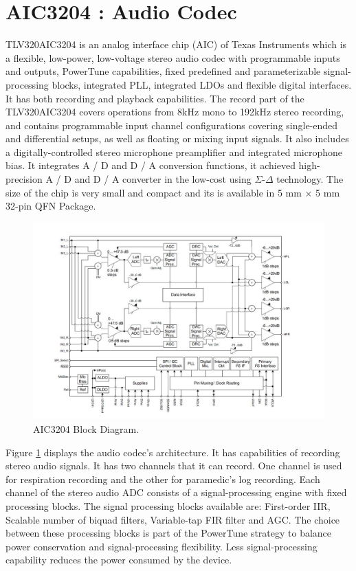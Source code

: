 \section{AIC3204 : Audio Codec}
TLV320AIC3204 is an analog interface chip (AIC) of Texas Instruments which is a flexible, low-power, low-voltage stereo audio codec with programmable inputs and outputs, PowerTune capabilities, fixed predefined and parameterizable signal-processing blocks, integrated PLL, integrated LDOs and flexible digital interfaces. It has both recording and playback capabilities. The record part of the TLV320AIC3204 covers operations from 8kHz mono to 192kHz stereo recording, and contains programmable input channel configurations covering single-ended and differential setups, as well as floating or mixing input signals. It also includes a digitally-controlled stereo microphone preamplifier and integrated microphone bias. It integrates A / D and D / A conversion functions, it achieved high-precision A / D and D / A converter in the low-cost using $\Sigma$-$\Delta$ technology. The size of the chip is very small and compact and its is available in  5 mm × 5 mm 32-pin QFN Package. 

\begin{figure}[h]
	\centering
	\includegraphics[scale = 0.7 ]{AIC3204.JPG}
	\caption{AIC3204 Block Diagram. \cite{audiocodec}\label{aic3204}}
\end{figure}

\hspace{10mm}Figure \ref{aic3204} displays the audio codec's architecture. It has capabilities of recording stereo audio signals. It has two channels that it can record. One channel is used for respiration recording and the other for paramedic's log recording. Each channel of the stereo audio ADC consists of a signal-processing engine with fixed processing blocks. The signal processing blocks available are: First-order IIR, Scalable number of biquad filters, Variable-tap FIR filter and AGC. The choice between these processing blocks is part of the PowerTune strategy to balance power conservation and signal-processing flexibility. Less signal-processing capability reduces the power
consumed by the device.
